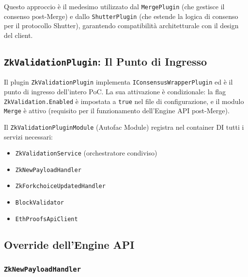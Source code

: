 \documentclass[12pt,a4paper,openright,twoside]{report}
\begin{document}
Questo approccio è il medesimo utilizzato dal \texttt{MergePlugin} (che gestisce il consenso post-Merge) e dallo \texttt{ShutterPlugin} (che estende la logica di consenso per il protocollo Shutter), garantendo compatibilità architetturale con il design del client.

\subsection{\texttt{ZkValidationPlugin}: Il Punto di Ingresso}

Il plugin \texttt{ZkValidationPlugin} implementa \texttt{IConsensusWrapperPlugin} ed è il punto di ingresso dell'intero PoC. La sua attivazione è condizionale: la flag \texttt{ZkValidation.Enabled} è impostata a \texttt{true} nel file di configurazione, e il modulo \texttt{Merge} è attivo (requisito per il funzionamento dell'Engine API post-Merge).

Il \texttt{ZkValidationPluginModule} (Autofac Module) registra nel container DI tutti i servizi necessari: 
\begin{itemize}
    \item \texttt{ZkValidationService} (orchestratore condiviso)
    \item \texttt{ZkNewPayloadHandler}
    \item \texttt{ZkForkchoiceUpdatedHandler}
    \item \texttt{BlockValidator}
    \item \texttt{EthProofsApiClient}
\end{itemize}

\subsection{Override dell'Engine API}

\subsubsection{\texttt{ZkNewPayloadHandler}}
\end{document}
